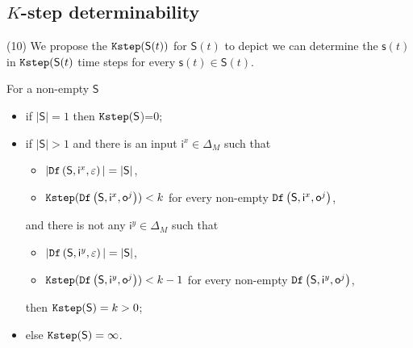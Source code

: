  
 
\subsection{$K$-step determinability}
{\color{red} (10)} We propose the ${\tt Kstep}(\mathsf{S}(t))$ for $\mathsf{S}(t)$ to depict we can determine the $\mathsf{s}(t)$ in ${\tt Kstep}(\mathsf{S}(t)$ time steps for every $\mathsf{s}(t)\in \mathsf{S}(t)$. 
\begin{definition}[$\Ks(\mathsf{S})$] 
For a non-empty $\mathsf{S}$
 \begin{itemize}
 \item   if $|\mathsf{S}|=1$ then ${\tt Kstep}(\mathsf{S}$)=0;
 \item  if $|\mathsf{S}|>1$ and there is an input $\mathsf{i}^{x} \in \Delta_M$ such that
 \begin{itemize}
 \item  $|{\tt Df}\left(\mathsf{S},\mathsf{i}^{x},\varepsilon\right)|=|\mathsf{S}|$,
 \item  ${\tt Kstep}({\tt Df}\left(\mathsf{S},\mathsf{i}^{x},\mathsf{o}^{j}\right))< k$ for every non-empty ${\tt Df}\left(\mathsf{S},\mathsf{i}^{x},\mathsf{o}^{j}\right)$,
 \end{itemize} 
 and there is not any $\mathsf{i}^{y} \in \Delta_M$ such that
  \begin{itemize}
 \item  $|{\tt Df}\left(\mathsf{S},\mathsf{i}^{y},\varepsilon\right)|=|\mathsf{S}|$,
 \item  ${\tt Kstep}({\tt Df}\left(\mathsf{S},\mathsf{i}^{y},\mathsf{o}^{j}\right))< k-1$ for every non-empty ${\tt Df}\left(\mathsf{S},\mathsf{i}^{y},\mathsf{o}^{j}\right)$,
 \end{itemize} 
then ${\tt Kstep}(\mathsf{S})=k>0$;%
 \item else ${\tt Kstep}(\mathsf{S})=\infty$.
 \end{itemize}
\end{definition}

